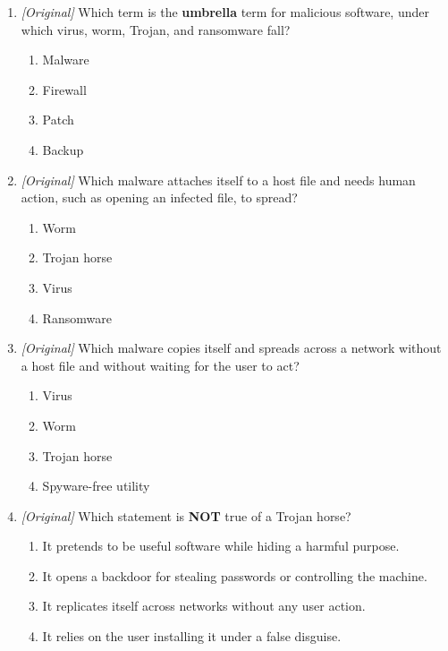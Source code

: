 \documentclass[11pt]{article}
\begin{document}
\begin{enumerate}[label=\textbf{Q\arabic*.}, leftmargin=*]
\begin{enumerate}[label=\Alph*.]
    \item Cyber contraventions and offences
    \item Regulation of printer hardware prices and typing-test fees
  \end{enumerate}
\item \textit{[Original]} Which term is the \textbf{umbrella} term for
  malicious software, under which virus, worm, Trojan, and ransomware fall?
  \begin{enumerate}[label=\Alph*.]
    \item Malware
    \item Firewall
    \item Patch
    \item Backup
  \end{enumerate}
\item \textit{[Original]} Which malware attaches itself to a host file and
  needs human action, such as opening an infected file, to spread?
  \begin{enumerate}[label=\Alph*.]
    \item Worm
    \item Trojan horse
    \item Virus
    \item Ransomware
  \end{enumerate}
\item \textit{[Original]} Which malware copies itself and spreads across a
  network without a host file and without waiting for the user to act?
  \begin{enumerate}[label=\Alph*.]
    \item Virus
    \item Worm
    \item Trojan horse
    \item Spyware-free utility
  \end{enumerate}
\item \textit{[Original]} Which statement is \textbf{NOT} true of a Trojan
  horse?
  \begin{enumerate}[label=\Alph*.]
    \item It pretends to be useful software while hiding a harmful purpose.
    \item It opens a backdoor for stealing passwords or controlling the machine.
    \item It replicates itself across networks without any user action.
    \item It relies on the user installing it under a false disguise.
  \end{enumerate}

\end{enumerate}
\end{document}
